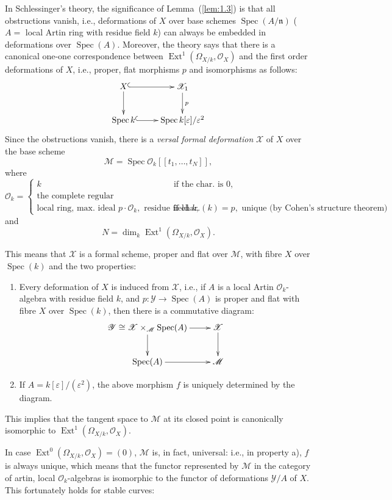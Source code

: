 \documentclass[10pt]{amsart}
\theoremstyle{plain}
\theoremstyle{definition}
\DeclareMathOperator{\Ext}{Ext}
\DeclareMathOperator{\Spec}{Spec}
\newcommand{\cO}{\mathcal{O}}
\begin{document}
In Schlessinger's theory, the significance of Lemma~(\ref{lem:1.3}) is that all obstructions vanish, i.e., deformations of $X$ over base schemes $\Spec(A/\mathfrak{n})$ ($A =$ local Artin ring with residue field $k$) can always be embedded in deformations over $\Spec(A)$. Moreover, the theory says that there is a canonical one-one correspondence between $\Ext^1(\Omega_{X/k}, \cO_X)$ and the first order deformations of $X$, i.e., proper, flat morphisms $p$ and isomorphisms as follows:
\[
\xymatrix{
X \ar@{^{(}->}[r] \ar[d] & \mathscr{X}_1 \ar[d]^p \\
\Spec k \ar@{^{(}->}[r] & \Spec k[\varepsilon]/\varepsilon^2
}
\]
Since the obstructions vanish, there is a \emph{versal formal deformation} $\mathscr{X}$ of $X$ over the base scheme
\[
\mathscr{M} = \Spec \mathcal{O}_k[[t_1, \ldots, t_N]],
\]
where
\[
\mathcal{O}_k = \begin{cases} k & \text{if the char. is } 0, \\ \text{the complete regular} \\ \text{local ring, max. ideal } p \cdot \mathcal{O}_k, \text{ residue field } k, & \text{if char.}(k) = p, \text{ unique (by Cohen's structure theorem)} \end{cases}
\]
and
\[
N = \dim_k \Ext^1(\Omega_{X/k}, \cO_X).
\]

This means that $\mathscr{X}$ is a formal scheme, proper and flat over $\mathscr{M}$, with fibre $X$ over $\Spec(k)$ and the two properties:

\begin{enumerate}
\item[a)] Every deformation of $X$ is induced from $\mathscr{X}$, i.e., if $A$ is a local Artin $\mathcal{O}_k$-algebra with residue field $k$, and $p: \mathscr{Y} \to \Spec(A)$ is proper and flat with fibre $X$ over $\Spec(k)$, then there is a commutative diagram:
\[
\xymatrix{
\mathscr{Y} \cong \mathscr{X} \times_{\mathscr{M}} \Spec(A) \ar[d] \ar[r] & \mathscr{X} \ar[d] \\
\Spec(A) \ar[r] & \mathscr{M}
}
\]
\item[b)] If $A = k[\varepsilon]/(\varepsilon^2)$, the above morphism $f$ is uniquely determined by the diagram.
\end{enumerate}
This implies that the tangent space to $\mathscr{M}$ at its closed point is canonically isomorphic to $\Ext^1(\Omega_{X/k}, \cO_X)$.

In case $\Ext^0(\Omega_{X/k}, \cO_X) = (0)$, $\mathscr{M}$ is, in fact, universal: i.e., in property a), $f$ is always unique, which means that the functor represented by $\mathscr{M}$ in the category of artin, local $\mathcal{O}_k$-algebras is isomorphic to the functor of deformations $\mathscr{Y}/A$ of $X$. This fortunately holds for stable curves:
\end{document}

